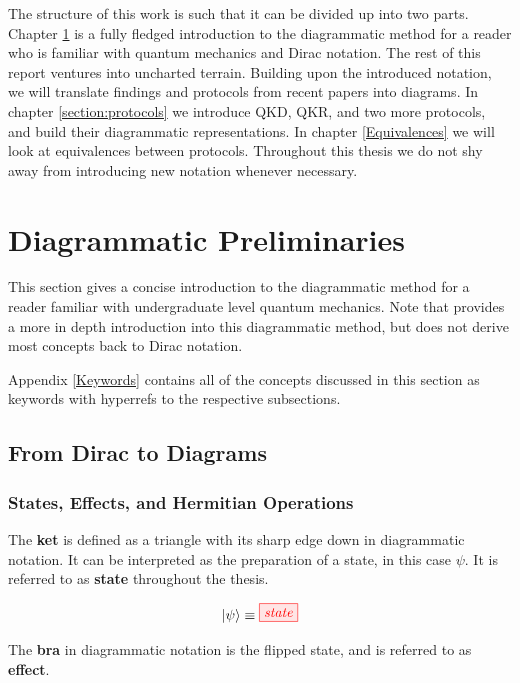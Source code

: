 \documentclass[]{article}
\begin{document}
The structure of this work is such that it can be divided up into two parts. Chapter \ref{section:preliminaries} is a fully fledged introduction to the diagrammatic method for a reader who is familiar with quantum mechanics and Dirac notation. The rest of this report ventures into uncharted terrain. Building upon the introduced notation, we will translate findings and protocols from recent papers into diagrams. In chapter \ref{section:protocols} we introduce QKD, QKR, and two more protocols, and build their diagrammatic representations. In chapter \ref{Equivalences} we will look at equivalences between protocols. Throughout this thesis we do not shy away from introducing new notation whenever necessary.
 
\section{Diagrammatic Preliminaries}
\label{section:preliminaries}

This section gives a concise introduction to the diagrammatic method for a reader familiar with undergraduate level quantum mechanics. Note that \cite{Coecke2017} provides a more in depth introduction into this diagrammatic method, but does not derive most concepts back to Dirac notation. 

Appendix \ref{Keywords} contains all of the concepts discussed in this section as keywords with hyperrefs to the respective subsections.

\subsection{From Dirac to Diagrams}

\subsubsection{States, Effects, and Hermitian Operations}

\label{braandket}
The \textbf{ket} is defined as a triangle with its sharp edge down in diagrammatic notation. It can be interpreted as the preparation of a state, in this case $\psi$. It is referred to as \textbf{state} throughout the thesis.

\begin{equation}
\label{equation:state}
\ket{\psi} \equiv \tikzfig{state}
\end{equation}

The \textbf{bra} in diagrammatic notation is the flipped state, and is referred to as \textbf{effect}. 
\end{document}
